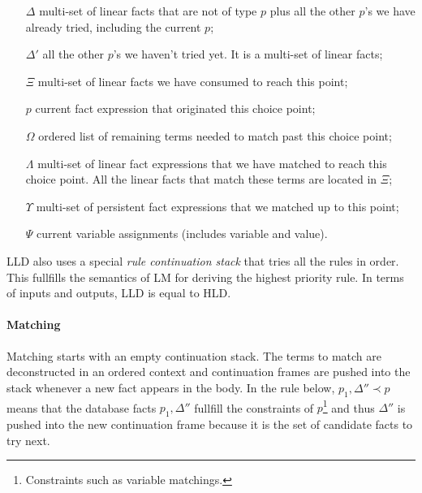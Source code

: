 \begin{enumerate}

   \item[$\Delta$] multi-set of linear facts that are not of type $p$ plus all
   the other $p$'s we have already tried, including the current $p$;

   \item[$\Delta'$] all the other $p$'s we haven't tried yet. It is a multi-set
   of linear facts;

   \item[$\Xi$] multi-set of linear facts we have consumed to reach this point;

   \item[$p$] current fact expression that originated this choice point;

   \item[$\Omega$] ordered list of remaining terms needed to match past this
   choice point;

   \item[$\Lambda$] multi-set of linear fact expressions that we have matched to
   reach this choice point. All the linear facts that match these terms are
   located in $\Xi$;

   \item[$\Upsilon$] multi-set of persistent fact expressions that we matched up
   to this point;

   \item[$\Psi$] current variable assignments (includes variable and value).

\end{enumerate}

LLD also uses a special \emph{rule continuation stack} that tries all the rules
in order. This fullfills the semantics of LM for deriving the highest priority
rule. In terms of inputs and outputs, LLD is equal to HLD.

\paragraph{Matching} Matching starts with an empty continuation stack. The terms
to match are deconstructed in an ordered context and continuation frames are
pushed into the stack whenever a new fact appears in the body. In the rule
below, $p_1, \Delta'' \prec p$ means that the database facts $p_1, \Delta''$
fullfill the constraints of $p$\footnote{Constraints such as variable
matchings.} and thus $\Delta''$ is pushed into the new continuation frame
because it is the set of candidate facts to try next.


